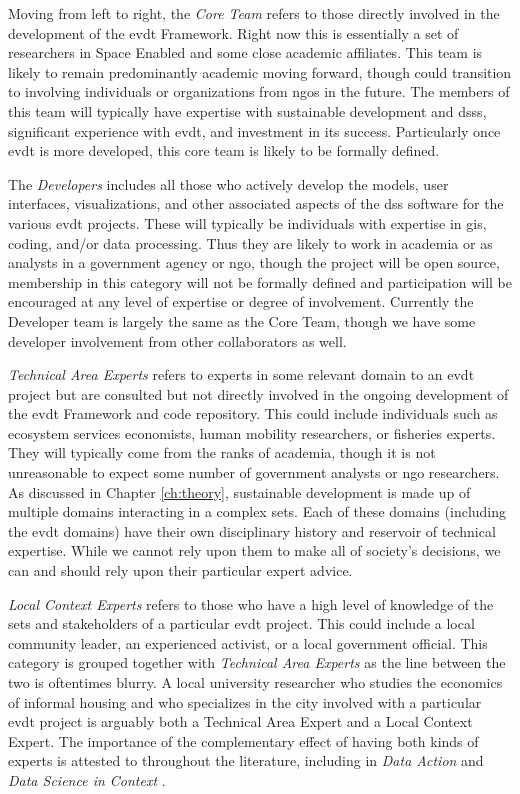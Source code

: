Moving from left to right, the \textit{Core Team} refers to those directly involved in the development of the \ac{evdt} Framework. Right now this is essentially a set of researchers in Space Enabled and some close academic affiliates. This team is likely to remain predominantly academic moving forward, though could transition to involving individuals or organizations from \acp{ngo} in the future. The members of this team will typically have expertise with sustainable development and \acp{dss}, significant experience with \ac{evdt}, and investment in its success. Particularly once \ac{evdt} is more developed, this core team is likely to be formally defined.

The \textit{Developers} includes all those who actively develop the models, user interfaces, visualizations, and other associated aspects of the \ac{dss} software for the various \ac{evdt} projects. These will typically be individuals with expertise in \ac{gis}, coding, and/or data processing. Thus they are likely to work in academia or as analysts in a government agency or \ac{ngo}, though the project will be open source, membership in this category will not be formally defined and participation will be encouraged at any level of expertise or degree of involvement. Currently the Developer team is largely the same as the Core Team, though we have some developer involvement from other collaborators as well.

\textit{Technical Area Experts} refers to experts in some relevant domain to an \ac{evdt} project but are consulted but not directly involved in the ongoing development of the \ac{evdt} Framework and code repository. This could include individuals such as ecosystem services economists, human mobility researchers, or fisheries experts. They will typically come from the ranks of academia, though it is not unreasonable to expect some number of government analysts or \ac{ngo} researchers. As discussed in Chapter \ref{ch:theory}, sustainable development is made up of multiple domains interacting in a complex \ac{sets}. Each of these domains (including the \ac{evdt} domains) have their own disciplinary history and reservoir of technical expertise. While we cannot rely upon them to make all of society's decisions, we can and should rely upon their particular expert advice. 

\textit{Local Context Experts} refers to those who have a high level of knowledge of the \ac{sets} and stakeholders of a particular \ac{evdt} project. This could include a local community leader, an experienced activist, or a local government official. This category is grouped together with \textit{Technical Area Experts} as the line between the two is oftentimes blurry. A local university researcher who studies the economics of informal housing and who specializes in the city involved with a particular \ac{evdt} project is arguably both a Technical Area Expert and a Local Context Expert. The importance of the complementary effect of having both kinds of experts is attested to throughout the literature, including in \textit{Data Action} \cite{williamsDataActionUsing2020} and \textit{Data Science in Context} \cite{spectorDataScienceContext2022}. 

